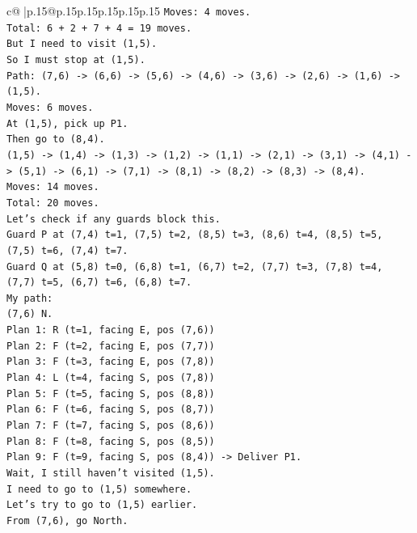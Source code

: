\documentclass{article}
\begin{document}
{\begin{supertabular}{c@{$\;$}|p{.15\linewidth}@{}p{.15\linewidth}p{.15\linewidth}p{.15\linewidth}p{.15\linewidth}p{.15\linewidth}}
{{{\texttt{Moves: 4 moves.} \\
\texttt{Total: 6 + 2 + 7 + 4 = 19 moves.} \\
\texttt{But I need to visit (1,5).} \\
\texttt{So I must stop at (1,5).} \\
\texttt{Path: (7,6) {-}> (6,6) {-}> (5,6) {-}> (4,6) {-}> (3,6) {-}> (2,6) {-}> (1,6) {-}> (1,5).} \\
\texttt{Moves: 6 moves.} \\
\texttt{At (1,5), pick up P1.} \\
\texttt{Then go to (8,4).} \\
\texttt{(1,5) {-}> (1,4) {-}> (1,3) {-}> (1,2) {-}> (1,1) {-}> (2,1) {-}> (3,1) {-}> (4,1) {-}> (5,1) {-}> (6,1) {-}> (7,1) {-}> (8,1) {-}> (8,2) {-}> (8,3) {-}> (8,4).} \\
\texttt{Moves: 14 moves.} \\
\texttt{Total: 20 moves.} \\
\texttt{Let's check if any guards block this.} \\
\texttt{Guard P at (7,4) t=1, (7,5) t=2, (8,5) t=3, (8,6) t=4, (8,5) t=5, (7,5) t=6, (7,4) t=7.} \\
\texttt{Guard Q at (5,8) t=0, (6,8) t=1, (6,7) t=2, (7,7) t=3, (7,8) t=4, (7,7) t=5, (6,7) t=6, (6,8) t=7.} \\
\texttt{My path:} \\
\texttt{(7,6) N.} \\
\texttt{Plan 1: R (t=1, facing E, pos (7,6))} \\
\texttt{Plan 2: F (t=2, facing E, pos (7,7))} \\
\texttt{Plan 3: F (t=3, facing E, pos (7,8))} \\
\texttt{Plan 4: L (t=4, facing S, pos (7,8))} \\
\texttt{Plan 5: F (t=5, facing S, pos (8,8))} \\
\texttt{Plan 6: F (t=6, facing S, pos (8,7))} \\
\texttt{Plan 7: F (t=7, facing S, pos (8,6))} \\
\texttt{Plan 8: F (t=8, facing S, pos (8,5))} \\
\texttt{Plan 9: F (t=9, facing S, pos (8,4)) {-}> Deliver P1.} \\
\texttt{Wait, I still haven't visited (1,5).} \\
\texttt{I need to go to (1,5) somewhere.} \\
\texttt{Let's try to go to (1,5) earlier.} \\
\texttt{From (7,6), go North.} \\
}}}
\end{supertabular}}
\end{document}
